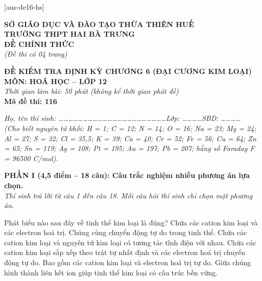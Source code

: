 \documentclass[11pt,a4paper]{article}
\def\loigiai#1{}
\begin{document}
[ans-de16-hs]

\noindent
\begin{minipage}[t]{0.48\textwidth}
	\textbf{SỞ GIÁO DỤC VÀ ĐÀO TẠO THỪA THIÊN HUẾ}\\
	\textbf{TRƯỜNG THPT HAI BÀ TRƯNG}\\
	\textbf{ĐỀ CHÍNH THỨC}\\
	\textit{(Đề thi có 04 trang)}
\end{minipage}\hfill
\begin{minipage}[t]{0.48\textwidth}
	\raggedleft
	\textbf{\color{mainGreen}ĐỀ KIỂM TRA ĐỊNH KỲ CHƯƠNG 6 (ĐẠI CƯƠNG KIM LOẠI)}\\
	\textbf{MÔN: HOÁ HỌC -- LỚP 12}\\
	\textit{Thời gian làm bài: 50 phút (không kể thời gian phát đề)}\\
	\textbf{Mã đề thi: 116}
\end{minipage}


\vspace{1pt}
\noindent\textit{Họ, tên thí sinh: \dots\dots\dots\dots\dots\dots\dots\dots\dots\dots\dots\dots\dots\dots\dots\dots\dots\dots\dots\dots\dots\dots Lớp: \dots\dots\dots\dots SBD: \dots\dots\dots\dots}\\
\noindent\textit{(Cho biết nguyên tử khối: H = 1; C = 12; N = 14; O = 16; Na = 23; Mg = 24; Al = 27; S = 32; Cl = 35,5; K = 39; Ca = 40; Cr = 52; Fe = 56; Cu = 64; Zn = 65; Sn = 119; Ag = 108; Pt = 195; Au = 197; Pb = 207; hằng số Faraday F = 96500 C/mol).}

\vspace{2pt}
\noindent
\textbf{PHẦN I (4,5 điểm -- 18 câu): Câu trắc nghiệm nhiều phương án lựa chọn.}\\
\textit{Thí sinh trả lời từ câu 1 đến câu 18. Mỗi câu hỏi thí sinh chỉ chọn một phương án.}

\setcounter{ex}{0}

\begin{ex}
Phát biểu nào sau đây về tinh thể kim loại là đúng?
\choice
{Chứa các cation kim loại và các electron hoá trị. Chúng cùng chuyển động tự do trong tinh thể.}
{Chứa các cation kim loại và nguyên tử kim loại có tương tác tĩnh điện với nhau.}
{Chứa các cation kim loại sắp xếp theo trật tự nhất định và các electron hoá trị chuyển động tự do.}
{Bao gồm các cation kim loại và electron hoá trị tự do. Giữa chúng hình thành liên kết ion giúp tinh thể kim loại có cấu trúc bền vững.}
\loigiai{}
\end{ex}
\end{document}
